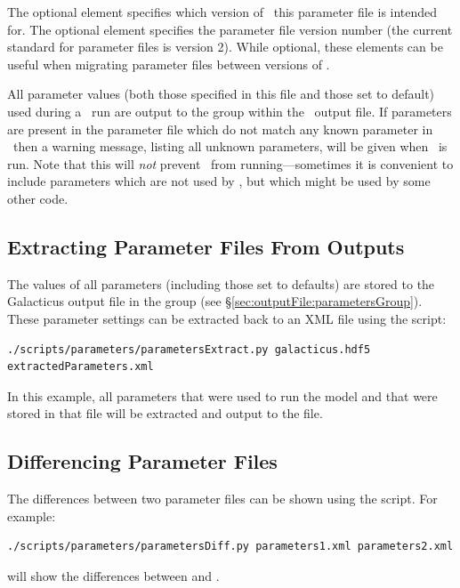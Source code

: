 The optional  element specifies which version of \glc\ this parameter file is intended for. The optional  element specifies the parameter file version number (the current standard for parameter files is version 2). While optional, these elements can be useful when migrating parameter files between versions of \glc.

All parameter values (both those specified in this file and those set to default) used during a \glc\ run are output to the  group within the \glc\ output file. If parameters are present in the parameter file which do not match any known parameter in \glc\ then a warning message, listing all unknown parameters, will be given when \glc\ is run. Note that this will \emph{not} prevent \glc\ from running---sometimes it is convenient to include parameters which are not used by \glc, but which might be used by some other code.

\subsection{Extracting Parameter Files From Outputs}

The values of all parameters (including those set to defaults) are stored to the Galacticus output file in the  group (see \S\ref{sec:outputFile:parametersGroup}). These parameter settings can be extracted back to an XML file using the  script: 
\begin{verbatim}
./scripts/parameters/parametersExtract.py galacticus.hdf5 extractedParameters.xml
\end{verbatim}
In this example, all parameters that were used to run the  model and that were stored in that file will be extracted and output to the  file.

\subsection{Differencing Parameter Files}

The differences between two parameter files can be shown using the  script. For example: 
\begin{verbatim}
./scripts/parameters/parametersDiff.py parameters1.xml parameters2.xml
\end{verbatim}
will show the differences between  and .

